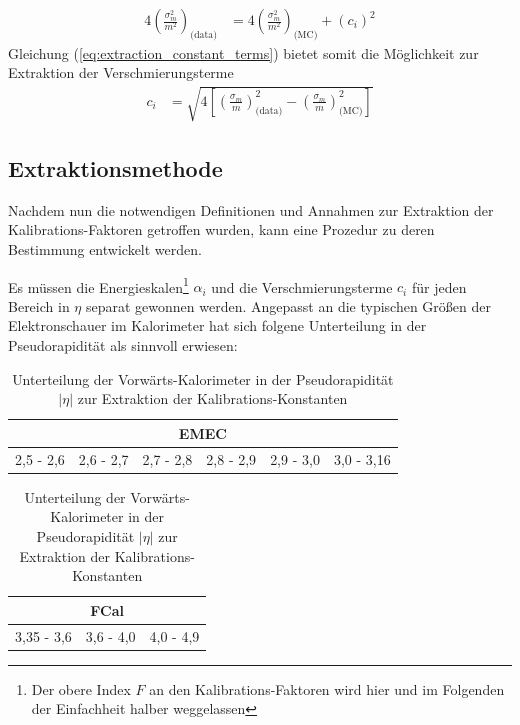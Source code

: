 \begin{align}
    \label{eq:extraction_constant_terms}
    4\left(\frac{\sigma_m^2}{m^2}\right)_\text{(data)}
        &= 4\left(\frac{\sigma_m^2}{m^2}\right)_\text{(MC)}
    + \left(c_i\right)^2
\end{align}
Gleichung (\ref{eq:extraction_constant_terms}) bietet somit die Möglichkeit zur
Extraktion der Verschmierungsterme
\begin{align}
    c_i &= \sqrt{ 4 \left[ \left(\frac{\sigma_m}{m}\right)^2_\text{(data)}
             - \left(\frac{\sigma_m}{m}\right)^2_\text{(MC)} \right] }
    \label{eq:constant_terms}
\end{align}



\subsection{Extraktionsmethode}
\label{energy_calibration:extraktionsmethode}
Nachdem nun die notwendigen Definitionen und Annahmen zur Extraktion der
Kali\-brations-Faktoren getroffen wurden, kann eine Prozedur zu deren
Bestimmung entwickelt werden.

Es müssen die Energieskalen\footnote{Der obere Index $F$ an den
Kalibrations-Faktoren wird hier und im Folgenden der Einfachheit halber
weggelassen} $\alpha_i$ und die Verschmierungsterme $c_i$ für jeden Bereich in
$\eta$ separat gewonnen werden. Angepasst an die typischen Größen der
Elektronschauer im Kalorimeter hat sich
folgene Unterteilung in der Pseudorapidität als sinnvoll erwiesen:

\begin{table}[h]
    \centering
    \begin{tabular}{|c|c|c|c|c|c|}
        \multicolumn{6}{c}{\textbf{EMEC}} \\
        \hline
        2,5 - 2,6 & 2,6 - 2,7 & 2,7 - 2,8 & 2,8 - 2,9 & 2,9 - 3,0 & 3,0 - 3,16
        \\ \hline
    \end{tabular}
    \vspace{10pt}

    \begin{tabular}{|c|c|c|}
        \multicolumn{3}{c}{\textbf{FCal}} \\
        \hline
        3,35 - 3,6 & 3,6 - 4,0 & 4,0 - 4,9 \\
        \hline
    \end{tabular}
    \caption{Unterteilung der Vorwärts-Kalorimeter in der Pseudorapidität
             $|\eta|$ zur Extraktion der Kalibrations-Konstanten}
    \label{tab:calibration_binning}
\end{table}


